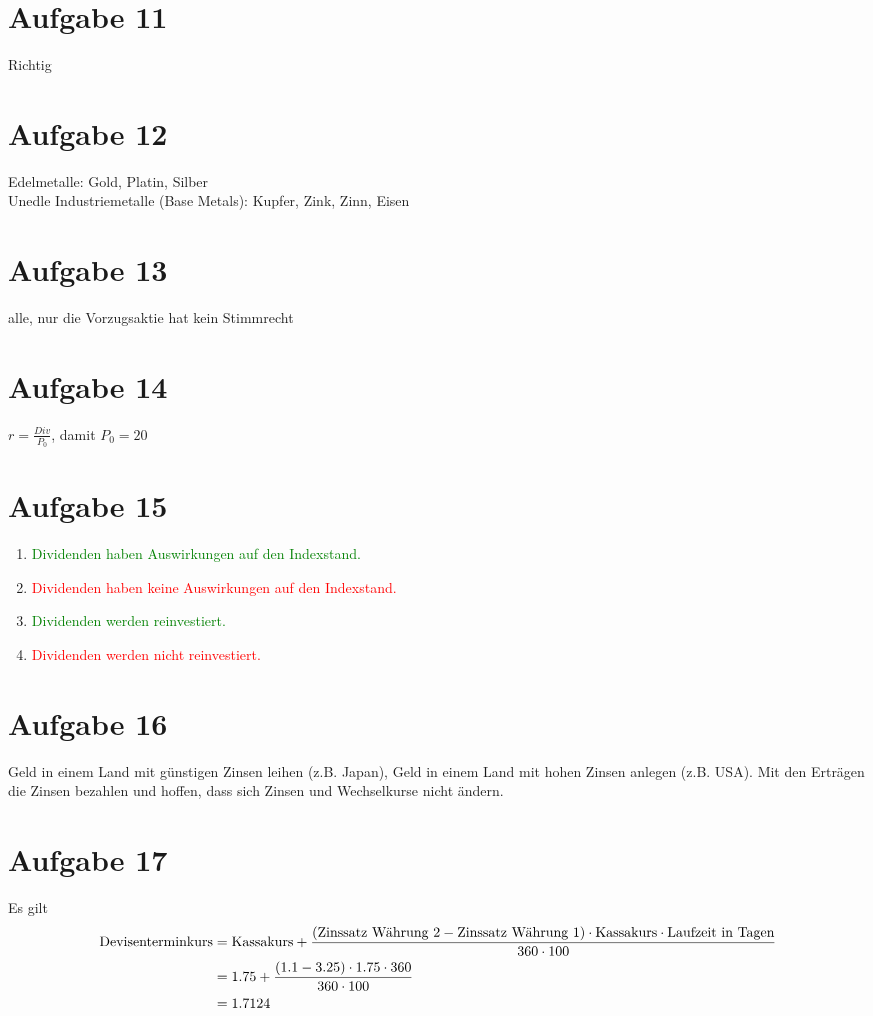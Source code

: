 \documentclass{article}
\begin{document}
	\section*{Aufgabe 11}
	Richtig
	
	\section*{Aufgabe 12}
	Edelmetalle: Gold, Platin, Silber \\
	Unedle Industriemetalle (Base Metals): Kupfer, Zink, Zinn, Eisen
	
	\section*{Aufgabe 13}
	alle, nur die Vorzugsaktie hat kein Stimmrecht
	
	\section*{Aufgabe 14}
	$r = \frac{Div}{P_0}$, damit $P_0=20$
	
	\section*{Aufgabe 15}
	\begin{enumerate}[label=(\alph*)]
		\item \textcolor{green}{Dividenden haben Auswirkungen auf den Indexstand.}
		\item \textcolor{red}{Dividenden haben keine Auswirkungen auf den Indexstand.}
		\item \textcolor{green}{Dividenden werden reinvestiert.}
		\item \textcolor{red}{Dividenden werden nicht reinvestiert.}
	\end{enumerate}
	
	\section*{Aufgabe 16}
	Geld in einem Land mit günstigen Zinsen leihen (z.B. Japan), Geld in einem Land mit hohen Zinsen anlegen (z.B. USA). Mit den Erträgen die Zinsen bezahlen und hoffen, dass sich Zinsen und Wechselkurse nicht ändern.
	
	\section*{Aufgabe 17}
	Es gilt
	\begin{align}
		\text{Devisenterminkurs} &= \text{Kassakurs} + \frac{(\text{Zinssatz Währung 2} - \text{Zinssatz Währung 1}) \cdot \text{Kassakurs} \cdot \text{Laufzeit in Tagen}}{360\cdot 100} \notag \\
		&= 1.75 + \frac{(1.1 - 3.25)\cdot 1.75\cdot 360}{360\cdot 100} \notag \\
		&= 1.7124 \notag
	\end{align}
\end{document}
